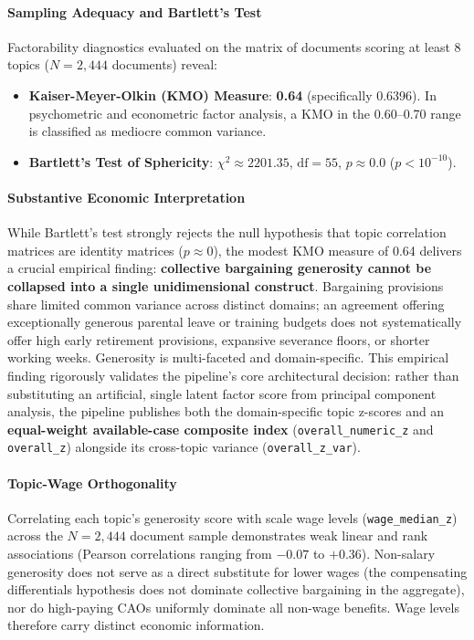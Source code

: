 \paragraph{Sampling Adequacy and Bartlett's Test}
Factorability diagnostics evaluated on the matrix of documents scoring at least 8 topics ($N = 2,444$ documents) reveal:
\begin{itemize}[leftmargin=1.5em]
  \item \textbf{Kaiser-Meyer-Olkin (KMO) Measure}: \textbf{0.64} (specifically 0.6396). In psychometric and econometric factor analysis, a KMO in the 0.60--0.70 range is classified as mediocre common variance.
  \item \textbf{Bartlett's Test of Sphericity}: $\chi^2 \approx 2201.35$, $\text{df} = 55$, $p \approx 0.0$ ($p < 10^{-10}$).
\end{itemize}

\paragraph{Substantive Economic Interpretation}
While Bartlett's test strongly rejects the null hypothesis that topic correlation matrices are identity matrices ($p \approx 0$), the modest KMO measure of 0.64 delivers a crucial empirical finding: \textbf{collective bargaining generosity cannot be collapsed into a single unidimensional construct}. Bargaining provisions share limited common variance across distinct domains; an agreement offering exceptionally generous parental leave or training budgets does not systematically offer high early retirement provisions, expansive severance floors, or shorter working weeks. Generosity is multi-faceted and domain-specific.
This empirical finding rigorously validates the pipeline's core architectural decision: rather than substituting an artificial, single latent factor score from principal component analysis, the pipeline publishes both the domain-specific topic z-scores and an \textbf{equal-weight available-case composite index} (\nolinkurl{overall_numeric_z} and \nolinkurl{overall_z}) alongside its cross-topic variance (\nolinkurl{overall_z_var}).

\paragraph{Topic-Wage Orthogonality}
Correlating each topic's generosity score with scale wage levels (\nolinkurl{wage_median_z}) across the $N = 2,444$ document sample demonstrates weak linear and rank associations (Pearson correlations ranging from $-0.07$ to $+0.36$). Non-salary generosity does not serve as a direct substitute for lower wages (the compensating differentials hypothesis does not dominate collective bargaining in the aggregate), nor do high-paying CAOs uniformly dominate all non-wage benefits. Wage levels therefore carry distinct economic information.
